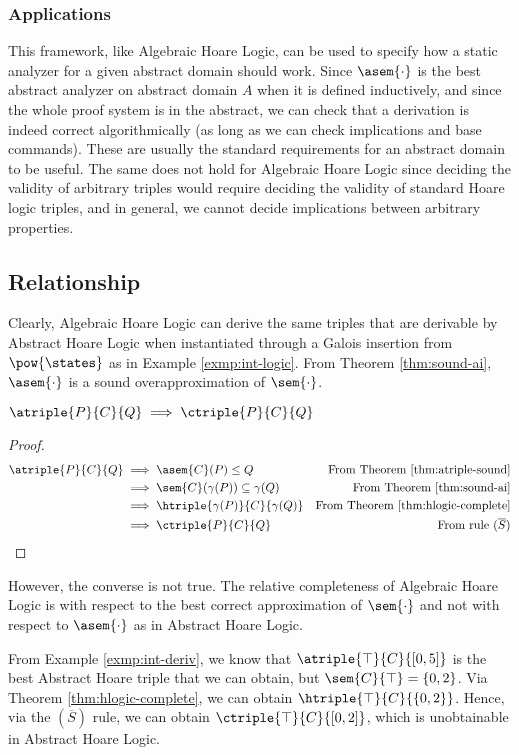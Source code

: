 \subsubsection{Applications}
This framework, like Algebraic Hoare Logic, can be used to specify how a static
analyzer for a given abstract domain should work. Since $\asem{\cdot}$ is the
best abstract analyzer on abstract domain $A$ when it is defined inductively,
and since the whole proof system is in the abstract, we can check that a
derivation is indeed correct algorithmically (as long as we can check
implications and base commands). These are usually the standard requirements for
an abstract domain to be useful. The same does not hold for Algebraic Hoare
Logic since deciding the validity of arbitrary triples would require deciding
the validity of standard Hoare logic triples, and in general, we cannot decide
implications between arbitrary properties.

\subsection{Relationship}
Clearly, Algebraic Hoare Logic can derive the same triples that are derivable by
Abstract Hoare Logic when instantiated through a Galois insertion from
$\pow{\states}$ as in Example \ref{exmp:int-logic}. From Theorem
\ref{thm:sound-ai}, $\asem{\cdot}$ is a sound overapproximation of
$\sem{\cdot}$.

\begin{theorem}
  $\atriple{P}{C}{Q} \implies \ctriple{P}{C}{Q}$
\end{theorem}
\begin{proof}
  \begin{align*}
    \atriple{P}{C}{Q}
      &\implies \asem{C}(P) \leq Q
      &\text{From Theorem \ref{thm:atriple-sound}} \\
      &\implies \sem{C}(\gamma(P)) \subseteq \gamma(Q)
      &\text{From Theorem \ref{thm:sound-ai}} \\
      &\implies \htriple{\gamma(P)}{C}{\gamma(Q)}
      &\text{From Theorem \ref{thm:hlogic-complete}} \\
      &\implies \ctriple{P}{C}{Q}
      &\text{From rule $(\overline{S})$} \\
  \end{align*}
\end{proof}

However, the converse is not true. The relative completeness of Algebraic Hoare
Logic is with respect to the best correct approximation of $\sem{\cdot}$ and not
with respect to $\asem{\cdot}$ as in Abstract Hoare Logic.

\begin{example}
  From Example \ref{exmp:int-deriv}, we know that $\atriple{\top}{C}{[0, 5]}$ is
  the best Abstract Hoare triple that we can obtain, but $\sem{C}{\top} = \{0,
  2\}$. Via Theorem \ref{thm:hlogic-complete}, we can obtain
  $\htriple{\top}{C}{\{0, 2\}}$. Hence, via the $(\overline{S})$ rule, we can
  obtain $\ctriple{\top}{C}{[0, 2]}$, which is unobtainable in Abstract Hoare
  Logic.
\end{example}
